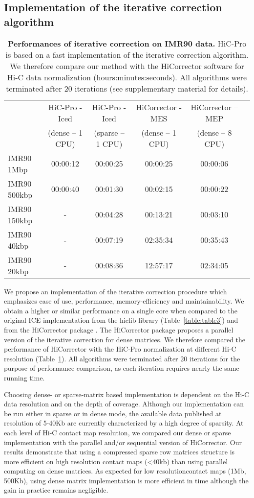 \subsection{Implementation of the iterative correction algorithm}

\begin{table}
\begin{tabular}{lccccc}
\hline
& HiC-Pro - Iced & HiC-Pro - Iced & HiCorrector - MES & HiCorrector – MEP \\
& {\small (dense – 1 CPU)} & {\small (sparse – 1 CPU)} & {\small (dense – 1
CPU)} & {\small (dense – 8 CPU)} \\
\hline
IMR90 1Mbp & 00:00:12 & 00:00:25 &00:00:25 & 00:00:06 \\
IMR90 500kbp & 00:00:40 & 00:01:30 & 00:02:15 & 00:00:22 \\
IMR90 150kbp & - & 00:04:28 & 00:13:21 & 00:03:10 \\
IMR90 40kbp & - & 00:07:19 & 02:35:34 & 00:35:43 \\
IMR90 20kbp & - & 00:08:36 & 12:57:17 & 02:34:05 \\
\end{tabular}
\caption{\textbf{Performances of iterative correction on IMR90 data.} HiC-Pro is based
on a fast implementation of the iterative correction algorithm. We therefore
compare our method with the HiCorrector software \citep{li:hi-corrector} for
Hi-C data normalization (hours:minutes:seconds). All algorithms were
terminated after 20 iterations (see supplementary material for details).}
\label{table:table4}
\end{table}

We propose an implementation of the iterative correction procedure which
emphasizes ease of use, performance, memory-efficiency and maintainability. We
obtain a higher or similar performance on a single core when compared to the
original ICE implementation from the hiclib library (Table~\ref{table:table3})
and from the HiCorrector package \citep{li:hi-corrector}. The HiCorrector
package proposes a parallel version of the iterative correction for dense
matrices. We therefore compared the performance of HiCorrector with the
HiC-Pro normalization at different Hi-C resolution (Table~\ref{table:table4}).
All algorithms were terminated after 20 iterations for the purpose of
performance comparison, as each iteration requires nearly the same running
time.

Choosing dense- or sparse-matrix based implementation is dependent on the Hi-C
data resolution and on the depth of coverage. Although our implementation can
be run either in sparse or in dense mode, the available data published at
resolution of 5-40Kb are currently characterized by a high degree of sparsity.
At each level of Hi-C contact map resolution, we compared our dense or sparse
implementation with the parallel and/or sequential version of HiCorrector. Our
results demonstrate that using a compressed sparse row matrices structure is
more efficient on high resolution contact maps (<40kb) than using parallel
computing on dense matrices. As expected for low resolutioncontact maps (1Mb,
500Kb), using dense matrix implementation is more efficient in time although
the gain in practice remains negligible.

